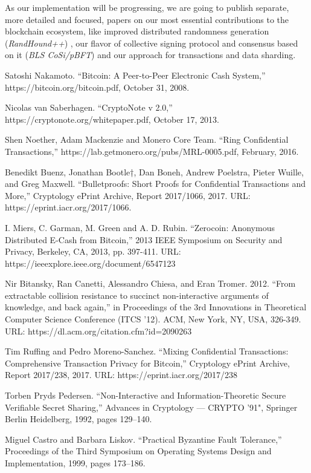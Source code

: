 \documentclass[a4paper, 10pt, conference]{ieeeconf}
\begin{document}
As our implementation will be progressing, we are going to publish separate, more detailed and focused, papers on our most essential contributions to the blockchain ecosystem, like improved distributed randomness generation (\textit{RandHound++}) , our flavor of collective signing protocol and consensus based on it (\textit{BLS CoSi/pBFT}) and our approach for transactions and data sharding. 

\begin{thebibliography}{99}

 Satoshi Nakamoto. ``Bitcoin: A Peer-to-Peer Electronic Cash System,'' https://bitcoin.org/bitcoin.pdf, October 31, 2008.

 Nicolas van Saberhagen. ``CryptoNote v 2.0,'' https://cryptonote.org/whitepaper.pdf, October 17, 2013.

 Shen Noether, Adam Mackenzie and Monero Core Team. ``Ring Confidential Transactions,'' https://lab.getmonero.org/pubs/MRL-0005.pdf, February, 2016.

 Benedikt Buenz, Jonathan Bootle†, Dan Boneh, Andrew Poelstra, Pieter Wuille, and Greg Maxwell. ``Bulletproofs: Short Proofs for Confidential Transactions and More,'' Cryptology ePrint Archive, Report 2017/1066, 2017. URL: https://eprint.iacr.org/2017/1066.

 I. Miers, C. Garman, M. Green and A. D. Rubin. ``Zerocoin: Anonymous Distributed E-Cash from Bitcoin,'' 2013 IEEE Symposium on Security and Privacy, Berkeley, CA, 2013, pp. 397-411. URL: https://ieeexplore.ieee.org/document/6547123

 Nir Bitansky, Ran Canetti, Alessandro Chiesa, and Eran Tromer. 2012. ``From extractable collision resistance to succinct non-interactive arguments of knowledge, and back again,'' in Proceedings of the 3rd Innovations in Theoretical Computer Science Conference (ITCS '12). ACM, New York, NY, USA, 326-349. URL: https://dl.acm.org/citation.cfm?id=2090263

 Tim Ruffing and Pedro Moreno-Sanchez. ``Mixing Confidential Transactions: Comprehensive Transaction Privacy for Bitcoin,'' Cryptology ePrint Archive, Report 2017/238, 2017. URL: https://eprint.iacr.org/2017/238

 Torben Pryds Pedersen. ``Non-Interactive and Information-Theoretic Secure Verifiable Secret Sharing,'' Advances in Cryptology --- CRYPTO '91", Springer Berlin Heidelberg, 1992, pages 129--140.

 Miguel Castro and Barbara Liskov. ``Practical Byzantine Fault Tolerance,'' Proceedings of the Third Symposium on Operating Systems Design and Implementation, 1999, pages 173--186. 


\end{thebibliography}
\end{document}
